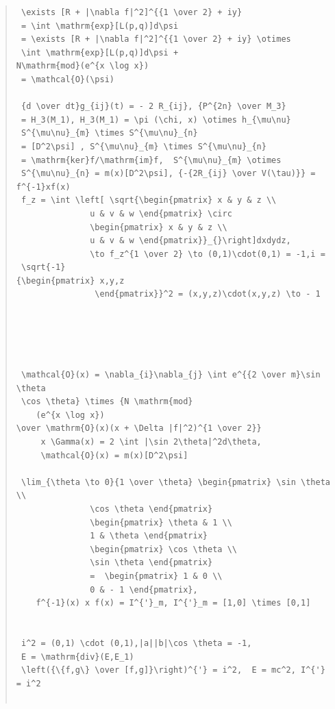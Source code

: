 \documentclass{jsarticle}
\begin{document}
{\begin{quote}
\begin{verbatim}
 \exists [R + |\nabla f|^2]^{{1 \over 2} + iy} 
 = \int \mathrm{exp}[L(p,q)]d\psi 
 = \exists [R + |\nabla f|^2]^{{1 \over 2} + iy} \otimes 
 \int \mathrm{exp}[L(p,q)]d\psi +
N\mathrm{mod}(e^{x \log x}) 
 = \mathcal{O}(\psi) 

 {d \over dt}g_{ij}(t) = - 2 R_{ij}, {P^{2n} \over M_3} 
 = H_3(M_1), H_3(M_1) = \pi (\chi, x) \otimes h_{\mu\nu} 
 S^{\mu\nu}_{m} \times S^{\mu\nu}_{n}
 = [D^2\psi] , S^{\mu\nu}_{m} \times S^{\mu\nu}_{n}
 = \mathrm{ker}f/\mathrm{im}f,  S^{\mu\nu}_{m} \otimes 
 S^{\mu\nu}_{n} = m(x)[D^2\psi], {-{2R_{ij} \over V(\tau)}} = f^{-1}xf(x) 
 f_z = \int \left[ \sqrt{\begin{pmatrix} x & y & z \\
			   u & v & w \end{pmatrix} \circ 
			   \begin{pmatrix} x & y & z \\
			   u & v & w \end{pmatrix}}_{}\right]dxdydz, 
			   \to f_z^{1 \over 2} \to (0,1)\cdot(0,1) = -1,i = 
 \sqrt{-1} 
{\begin{pmatrix} x,y,z
			    \end{pmatrix}}^2 = (x,y,z)\cdot(x,y,z) \to - 1 

			  



 \mathcal{O}(x) = \nabla_{i}\nabla_{j} \int e^{{2 \over m}\sin \theta
 \cos \theta} \times {N \mathrm{mod}
	(e^{x \log x})
\over \mathrm{O}(x)(x + \Delta |f|^2)^{1 \over 2}} 
	 x \Gamma(x) = 2 \int |\sin 2\theta|^2d\theta, 
	 \mathcal{O}(x) = m(x)[D^2\psi] 
	
 \lim_{\theta \to 0}{1 \over \theta} \begin{pmatrix} \sin \theta \\
			   \cos \theta \end{pmatrix} 
			   \begin{pmatrix} \theta & 1 \\
			   1 & \theta \end{pmatrix} 
			   \begin{pmatrix} \cos \theta \\
			   \sin \theta \end{pmatrix}
			   =  \begin{pmatrix} 1 & 0 \\
			   0 & - 1 \end{pmatrix}, 
	f^{-1}(x) x f(x) = I^{'}_m, I^{'}_m = [1,0] \times [0,1] 


 i^2 = (0,1) \cdot (0,1),|a||b|\cos \theta = -1, 
 E = \mathrm{div}(E,E_1) 
 \left({\{f,g\} \over [f,g]}\right)^{'} = i^2,  E = mc^2, I^{'} = i^2 


\end{verbatim}
\end{quote}}
\end{document}
